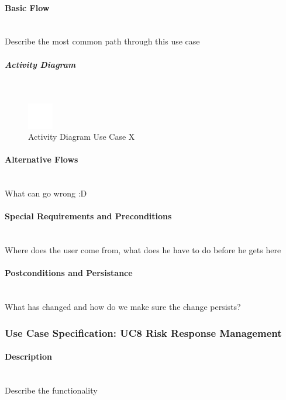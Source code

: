 \paragraph*{Basic Flow} \mbox{}\\

Describe the most common path through this use case

\subparagraph{Activity Diagram}\mbox{}\\
\begin{figure}[h]
	\centering
	\includegraphics[width=0.1\textwidth]{Content/Domain/placeholder.png}
	\caption{Activity Diagram Use Case X}
	\label{fig:label77}
\end{figure}

\paragraph*{Alternative Flows}\mbox{}\\
What can go wrong :D

\paragraph*{Special Requirements and Preconditions}\mbox{}\\
Where does the user come from, what does he have to do before he gets here

\paragraph*{Postconditions and Persistance}\mbox{}\\
What has changed and how do we make sure the change persists?

\newpage
\subsubsection{Use Case Specification: \ac{UC}8 Risk Response Management}
\label{sec:domainBbi}

\paragraph*{Description}\mbox{}\\
Describe the functionality

